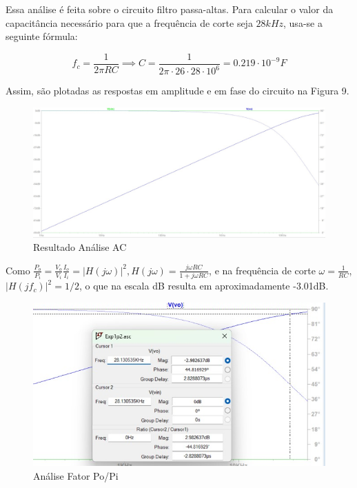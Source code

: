 \documentclass[10pt,twocolumn,letterpaper]{article}
\begin{document}
Essa análise é feita sobre o circuito filtro passa-altas. Para calcular o valor da capacitância necessário para que a frequência de corte seja $28kHz$, usa-se a seguinte fórmula:

\[f_c=\frac{1}{2\pi RC} \implies C = \frac{1}{2\pi\cdot26\cdot28\cdot10^6}=0.219\cdot10^{-9}F\]

Assim, são plotadas as respostas em amplitude e em fase do circuito na Figura 9.

\begin{figure}[h]
\caption{Resultado Análise AC}
\includegraphics[scale=0.15]{figuras/fig9}
\end{figure}\newpage

Como $\frac{P_o}{P_i} = \frac{V_o}{V_i}\frac{I_o}{I_i} = |H(j\omega)|^2, H(j\omega) = \frac{j\omega RC}{1+j\omega RC}$, e na frequência de corte $\omega=\frac{1}{RC}$, $|H(jf_c)|^2 = 1/2$, o que na escala dB resulta em aproximadamente -3.01dB.

\begin{figure}[h]
\caption{Análise Fator Po/Pi}
\begin{center}
\includegraphics[scale=0.2]{figuras/fig13}
\end{center}
\end{figure}
\end{document}
